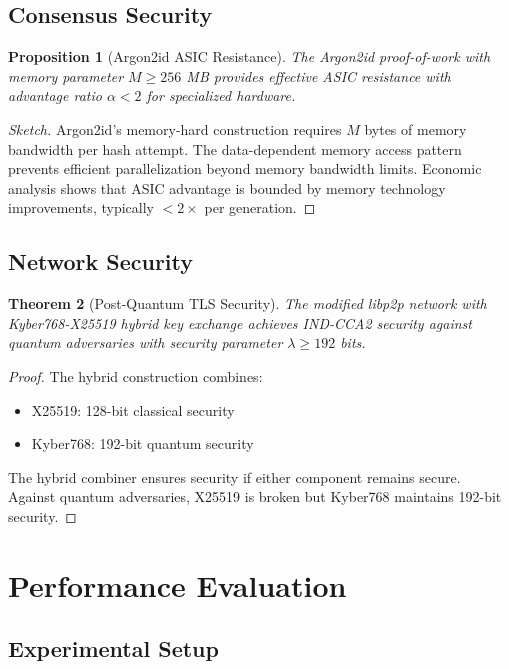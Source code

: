 \documentclass[12pt,a4paper]{article}
\newtheorem{theorem}{Theorem}
\newtheorem{proposition}[theorem]{Proposition}
\begin{document}
\subsection{Consensus Security}

\begin{proposition}[Argon2id ASIC Resistance]
The Argon2id proof-of-work with memory parameter $M \geq 256$ MB provides effective ASIC resistance with advantage ratio $\alpha < 2$ for specialized hardware.
\end{proposition}

\begin{proof}[Sketch]
Argon2id's memory-hard construction requires $M$ bytes of memory bandwidth per hash attempt. The data-dependent memory access pattern prevents efficient parallelization beyond memory bandwidth limits. Economic analysis shows that ASIC advantage is bounded by memory technology improvements, typically $< 2\times$ per generation.
\end{proof}

\subsection{Network Security}

\begin{theorem}[Post-Quantum TLS Security]
The modified libp2p network with Kyber768-X25519 hybrid key exchange achieves IND-CCA2 security against quantum adversaries with security parameter $\lambda \geq 192$ bits.
\end{theorem}

\begin{proof}
The hybrid construction combines:
\begin{itemize}
\item X25519: 128-bit classical security
\item Kyber768: 192-bit quantum security
\end{itemize}
The hybrid combiner ensures security if either component remains secure. Against quantum adversaries, X25519 is broken but Kyber768 maintains 192-bit security.
\end{proof}

\section{Performance Evaluation}

\subsection{Experimental Setup}
\end{document}
